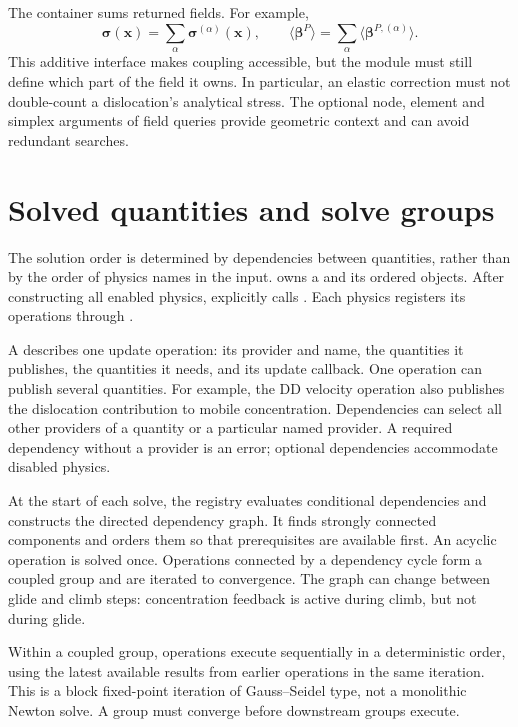 The container sums returned fields. For example,
\begin{equation}
\bm\sigma(\bm x)=\sum_\alpha\bm\sigma^{(\alpha)}(\bm x),\qquad
\langle\bm\beta^P\rangle=\sum_\alpha\langle\bm\beta^{P,(\alpha)}\rangle.
\end{equation}
This additive interface makes coupling accessible, but the module must still define which part of the field it owns. In particular, an elastic correction must not double-count a dislocation's analytical stress. The optional node, element and simplex arguments of field queries provide geometric context and can avoid redundant searches.

\section{Solved quantities and solve groups}\label{sec:solvedQuantities}
The solution order is determined by dependencies between quantities, rather than by the order of physics names in the input.  owns a  and its ordered  objects. After constructing all enabled physics,  explicitly calls . Each physics registers its operations through .

A  describes one update operation: its provider and name, the quantities it publishes, the quantities it needs, and its update callback. One operation can publish several quantities. For example, the DD velocity operation also publishes the dislocation contribution to mobile concentration. Dependencies can select all other providers of a quantity or a particular named provider. A required dependency without a provider is an error; optional dependencies accommodate disabled physics.

At the start of each solve, the registry evaluates conditional dependencies and constructs the directed dependency graph. It finds strongly connected components and orders them so that prerequisites are available first. An acyclic operation is solved once. Operations connected by a dependency cycle form a coupled group and are iterated to convergence. The graph can change between glide and climb steps: concentration feedback is active during climb, but not during glide.

Within a coupled group, operations execute sequentially in a deterministic order, using the latest available results from earlier operations in the same iteration. This is a block fixed-point iteration of Gauss--Seidel type, not a monolithic Newton solve. A group must converge before downstream groups execute.

